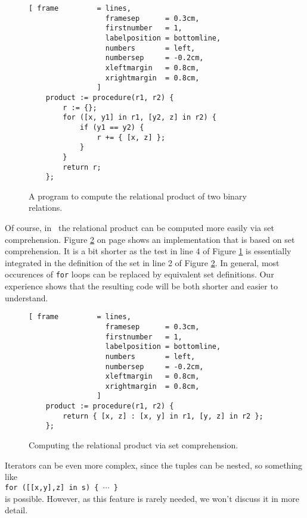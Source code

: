 \begin{figure}[!ht]
\centering
\begin{Verbatim}[ frame         = lines, 
                  framesep      = 0.3cm, 
                  firstnumber   = 1,
                  labelposition = bottomline,
                  numbers       = left,
                  numbersep     = -0.2cm,
                  xleftmargin   = 0.8cm,
                  xrightmargin  = 0.8cm,
                ]
    product := procedure(r1, r2) {
        r := {};
        for ([x, y1] in r1, [y2, z] in r2) {
            if (y1 == y2) {
                r += { [x, z] };
            }
        }
        return r;
    };
\end{Verbatim}
\vspace*{-0.3cm}
\caption{A program to compute the relational product of two binary relations.}
\label{fig:relational-product-for.stlx}
\end{figure}

Of course, in \setlx\ the relational product can be computed more easily via set comprehension.
Figure \ref{fig:relational-product.stlx} on page \pageref{fig:relational-product.stlx} shows
an implementation that is based on set comprehension.  It is a bit shorter as the test in
line 4 of Figure \ref{fig:relational-product-for.stlx} is essentially integrated in the
definition of the set in line 2 of Figure \ref{fig:relational-product.stlx}.
In general, most occurences of \texttt{for} loops can be replaced by equivalent set
definitions. Our experience shows that the resulting code will be both shorter and easier to understand.


\begin{figure}[!ht]
\centering
\begin{Verbatim}[ frame         = lines, 
                  framesep      = 0.3cm, 
                  firstnumber   = 1,
                  labelposition = bottomline,
                  numbers       = left,
                  numbersep     = -0.2cm,
                  xleftmargin   = 0.8cm,
                  xrightmargin  = 0.8cm,
                ]
    product := procedure(r1, r2) {
        return { [x, z] : [x, y] in r1, [y, z] in r2 };
    };
\end{Verbatim}
\vspace*{-0.3cm}
\caption{Computing the relational product via set comprehension.}
\label{fig:relational-product.stlx}
\end{figure}

Iterators can be even more complex, since the tuples can be nested, so something like
\\[0.2cm]
\hspace*{1.3cm}
\texttt{for ([[x,y],z] in s) \{ $\cdots$ \}}
\\[0.2cm]
is possible.  However, as this feature is rarely needed, we won't discuss it in more detail.


